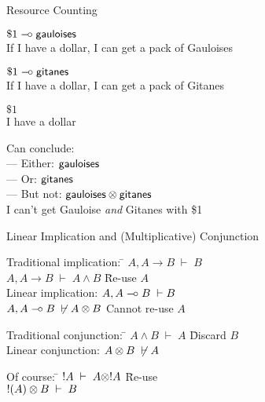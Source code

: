 \begin{hslide}{Resource Counting}

\begin{items}
\item $ \$ 1\;\mbox{$-\hspace*{-.4ex}\circ$}\; \mbox{\sf gauloises}$\\
{\small If I have a dollar, I can get a pack of Gauloises}

\item $ \$ 1\;\mbox{$-\hspace*{-.4ex}\circ$}\; \mbox{\sf gitanes}$\\
{\small If I have a dollar, I can get a pack of Gitanes}

\item $ \$ 1$\\
{\small I have a dollar}
\end{items}

Can conclude:\\
{\small \hspace*{1em} --- Either:} $\mbox{\sf gauloises}$\\
{\small \hspace*{1em} --- Or:} $\mbox{\sf gitanes}$\\
{\small \hspace*{1em} --- But not:} $\mbox{\sf gauloises} \otimes \mbox{\sf gitanes}$\\
{\small \hspace*{2em} I can't get Gauloise {\em and} Gitanes with \$1}

\end{hslide}

\begin{hslide}{Linear Implication and (Multiplicative) Conjunction}

\begin{tabbing}
Traditional implication: \=
             $A, A\rightarrow B \; \vdash \; B$\\
          \> $A, A\rightarrow B \; \vdash \; A\wedge B$
 \hspace*{1em}\= {\small Re-use $A$}\\[1ex]
 
Linear implication: \>
                     $A, A\;\mbox{$-\hspace*{-.4ex}\circ$}\; B \; \vdash B$\\
                    \> $A, A\;\mbox{$-\hspace*{-.4ex}\circ$}\; B \; \not\vdash A\otimes B$ 
                      \> {\small Cannot re-use $A$}
\end{tabbing}

\bigskip

\begin{tabbing}
Traditional conjunction: \= $A\wedge B \; \vdash \;
A$ \hspace*{4em}\={\small Discard $B$}\\[1ex]
Linear conjunction:\> $A\otimes B \; \not\vdash A$
\end{tabbing}


\bigskip

\begin{tabbing}
Of course: \= $!A \; \vdash \; A\otimes !A$ \hspace*{9em}\={\small Re-use}\\
           \> $!(A)\otimes B \; \vdash \; B$ 
\end{tabbing}
\end{hslide}

